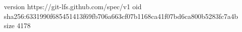 version https://git-lfs.github.com/spec/v1
oid sha256:6331990f685451413f69fb706a663cf07b1168ca41f07bd6ca800b5283fc7a4b
size 4178
